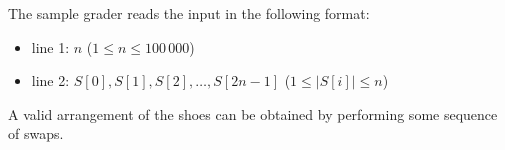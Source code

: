 The sample grader reads the input in the following format:
\begin{itemize}
\item line 1: $n$ ($1 \leq n \leq 100\,000$)
\item line 2: $S[0], S[1], S[2], \ldots, S[2n-1]$ ($1 \leq |S[i]| \leq n$)
\end{itemize}

A valid arrangement of the shoes can be obtained by performing some sequence of swaps.
